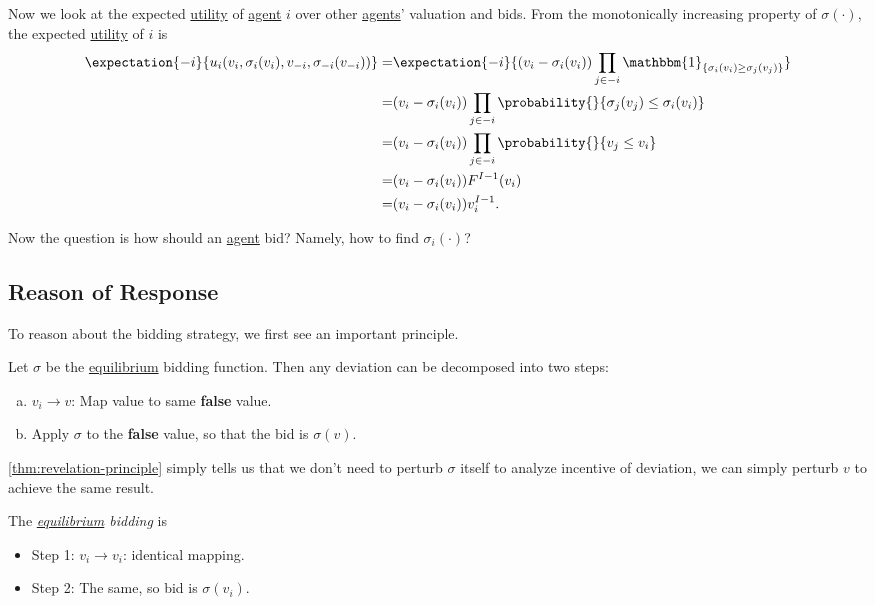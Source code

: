 Now we look at the expected \hyperref[def:reward]{utility}  of \hyperref[def:player]{agent} \(i\) over other \hyperref[def:player]{agents}' valuation and bids.
From the monotonically increasing property of \(\sigma(\cdot)\), the expected \hyperref[def:reward]{utility}  of \(i\) is
\[
	\begin{split}
		\expectation{-i}{u_{i}(v_{i}, \sigma_{i}(v_{i}), v_{-i}, \sigma_{-i}(v_{-i}))}
		= &\expectation{-i}{(v_{i} - \sigma_{i}(v_{i})) \prod\limits_{j\in -i}\mathbbm{1}_{\{ \sigma_{i}(v_{i})\geq \sigma_{j}(v_{j}) \}}}\\
		= &(v_{i} - \sigma_{i}(v_{i}))\prod\limits_{j\in -i}\probability{}{\sigma_{j}(v_{j})\leq \sigma_{i}(v_{i})}\\
		= &(v_{i} - \sigma_{i}(v_{i}))\prod\limits_{j\in -i}\probability{}{v_{j}\leq v_{i}}\\
		= &(v_{i} - \sigma_{i}(v_{i}))F^{I-1}(v_{i})\\
		= &(v_{i} - \sigma_{i}(v_{i}))v_{i}^{I-1}.
	\end{split}
\]

Now the question is how should an \hyperref[def:player]{agent} bid? Namely, how to find \(\sigma_{i}(\cdot)\)?
\subsection{Reason of Response}
To reason about the bidding strategy, we first see an important principle.
\begin{theorem}\label{thm:revelation-principle}
	Let \(\sigma\) be the \hyperref[def:Nash-equilibrium]{equilibrium} bidding function. Then any deviation can be decomposed into two steps:
	\begin{enumerate}[(a)]
		\item \(v_{i}\to v\): Map value to same \textbf{false} value.
		\item Apply \(\sigma\) to the \textbf{false} value, so that the bid is \(\sigma(v)\).
	\end{enumerate}
\end{theorem}

\begin{intuition}
	\autoref{thm:revelation-principle} simply tells us that we don't need to perturb \(\sigma\) itself to analyze incentive of deviation,
	we can simply perturb \(v\) to achieve the same result.
\end{intuition}

\begin{remark}\label{rmk:equilibrium-bidding}
	The \emph{\hyperref[def:Nash-equilibrium]{equilibrium} bidding} is
	\begin{itemize}
		\item Step 1: \(v_{i}\to v_{i}\): identical mapping.
		\item Step 2: The same, so bid is \(\sigma(v_{i})\).
	\end{itemize}
\end{remark}

